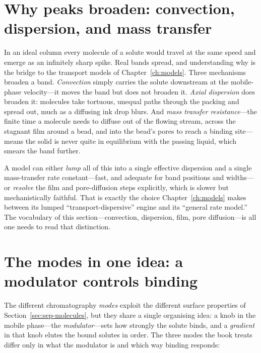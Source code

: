 \section{Why peaks broaden: convection, dispersion, and mass transfer}
\label{sec:sep-masstransfer}

In an ideal column every molecule of a solute would travel at the same speed and
emerge as an infinitely sharp spike. Real bands spread, and understanding why is
the bridge to the transport models of Chapter~\ref{ch:models}. Three mechanisms
broaden a band. \emph{Convection} simply carries the solute downstream at the
mobile-phase velocity---it moves the band but does not broaden it. \emph{Axial
dispersion} does broaden it: molecules take tortuous, unequal paths through the
packing and spread out, much as a diffusing ink drop blurs. And \emph{mass
transfer resistance}---the finite time a molecule needs to diffuse out of the
flowing stream, across the stagnant film around a bead, and into the bead's
pores to reach a binding site---means the solid is never quite in equilibrium with
the passing liquid, which smears the band further.

A model can either \emph{lump} all of this into a single effective dispersion and
a single mass-transfer rate constant---fast, and adequate for band positions and
widths---or \emph{resolve} the film and pore-diffusion steps explicitly, which is
slower but mechanistically faithful. That is exactly the choice
Chapter~\ref{ch:models} makes between its lumped ``transport-dispersive'' engine
and its ``general rate model.'' The vocabulary of this section---convection,
dispersion, film, pore diffusion---is all one needs to read that distinction.

\section{The modes in one idea: a modulator controls binding}
\label{sec:sep-modes}

The different chromatography \emph{modes} exploit the different surface
properties of Section~\ref{sec:sep-molecules}, but they share a single
organising idea: a knob in the mobile phase---the \emph{modulator}---sets how
strongly the solute binds, and a \emph{gradient} in that knob elutes the bound
solutes in order. The three modes the book treats differ only in what the
modulator is and which way binding responds:

